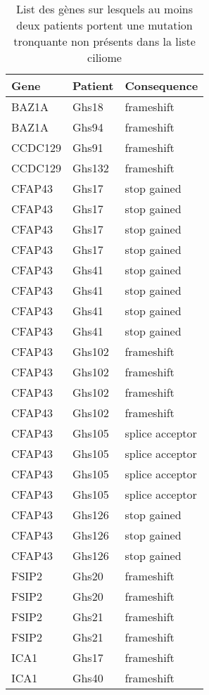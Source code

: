 \documentclass[12pt,twoside]{reedthesis}
\theoremstyle{definition}
\theoremstyle{definition}
\theoremstyle{remark}
\begin{document}
  \newpage  
  
  \begin{longtable}[t]{lll}
  \caption{\label{tab:tabgrp2high}List des gènes sur lesquels au moins deux patients portent une mutation tronquante non présents dans la liste ciliome }\\
  \toprule
  Gene & Patient & Consequence\\
  \midrule
  BAZ1A & Ghs18 & frameshift\\
  BAZ1A & Ghs94 & frameshift\\
  CCDC129 & Ghs91 & frameshift\\
  CCDC129 & Ghs132 & frameshift\\
  CFAP43 & Ghs17 & stop gained\\
  \addlinespace
  CFAP43 & Ghs17 & stop gained\\
  CFAP43 & Ghs17 & stop gained\\
  CFAP43 & Ghs17 & stop gained\\
  CFAP43 & Ghs41 & stop gained\\
  CFAP43 & Ghs41 & stop gained\\
  \addlinespace
  CFAP43 & Ghs41 & stop gained\\
  CFAP43 & Ghs41 & stop gained\\
  CFAP43 & Ghs102 & frameshift\\
  CFAP43 & Ghs102 & frameshift\\
  CFAP43 & Ghs102 & frameshift\\
  \addlinespace
  CFAP43 & Ghs102 & frameshift\\
  CFAP43 & Ghs105 & splice acceptor\\
  CFAP43 & Ghs105 & splice acceptor\\
  CFAP43 & Ghs105 & splice acceptor\\
  CFAP43 & Ghs105 & splice acceptor\\
  \addlinespace
  CFAP43 & Ghs126 & stop gained\\
  CFAP43 & Ghs126 & stop gained\\
  CFAP43 & Ghs126 & stop gained\\
  FSIP2 & Ghs20 & frameshift\\
  FSIP2 & Ghs20 & frameshift\\
  \addlinespace
  FSIP2 & Ghs21 & frameshift\\
  FSIP2 & Ghs21 & frameshift\\
  ICA1 & Ghs17 & frameshift\\
  ICA1 & Ghs40 & frameshift\\

\end{longtable}
\end{document}
